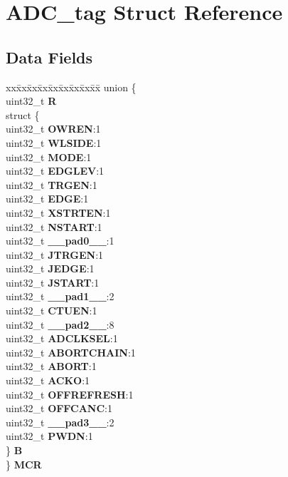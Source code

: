 \hypertarget{structADC__tag}{}\section{A\+D\+C\+\_\+tag Struct Reference}
\label{structADC__tag}
\subsection*{Data Fields}
\begin{DoxyCompactItemize}
\item 
\mbox{\label{structADC__tag_ad09914bae96a9cc9574bccfd6d01c623}} 
\begin{tabbing}
xx\=xx\=xx\=xx\=xx\=xx\=xx\=xx\=xx\=\kill
union \{\\
\>uint32\_t {\bfseries R}\\
\>struct \{\\
\>\>uint32\_t {\bfseries OWREN}:1\\
\>\>uint32\_t {\bfseries WLSIDE}:1\\
\>\>uint32\_t {\bfseries MODE}:1\\
\>\>uint32\_t {\bfseries EDGLEV}:1\\
\>\>uint32\_t {\bfseries TRGEN}:1\\
\>\>uint32\_t {\bfseries EDGE}:1\\
\>\>uint32\_t {\bfseries XSTRTEN}:1\\
\>\>uint32\_t {\bfseries NSTART}:1\\
\>\>uint32\_t {\bfseries \_\_pad0\_\_}:1\\
\>\>uint32\_t {\bfseries JTRGEN}:1\\
\>\>uint32\_t {\bfseries JEDGE}:1\\
\>\>uint32\_t {\bfseries JSTART}:1\\
\>\>uint32\_t {\bfseries \_\_pad1\_\_}:2\\
\>\>uint32\_t {\bfseries CTUEN}:1\\
\>\>uint32\_t {\bfseries \_\_pad2\_\_}:8\\
\>\>uint32\_t {\bfseries ADCLKSEL}:1\\
\>\>uint32\_t {\bfseries ABORTCHAIN}:1\\
\>\>uint32\_t {\bfseries ABORT}:1\\
\>\>uint32\_t {\bfseries ACKO}:1\\
\>\>uint32\_t {\bfseries OFFREFRESH}:1\\
\>\>uint32\_t {\bfseries OFFCANC}:1\\
\>\>uint32\_t {\bfseries \_\_pad3\_\_}:2\\
\>\>uint32\_t {\bfseries PWDN}:1\\
\>\} {\bfseries B}\\
\} {\bfseries MCR}\\


\end{tabbing}
\end{DoxyCompactItemize}
